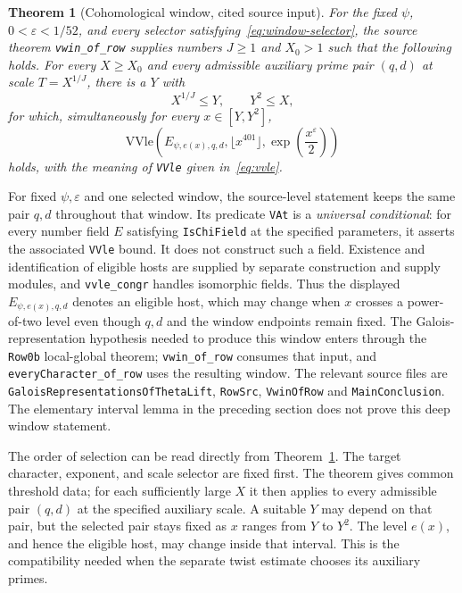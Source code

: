 \documentclass[11pt,openany,oneside]{scrbook}
\newtheorem{theorem}{Theorem}[chapter]
\theoremstyle{definition}
\theoremstyle{remark}
\newcommand{\eps}{\varepsilon}
\begin{document}
\begin{theorem}[Cohomological window, cited source input]\label{thm:quantified-window}
For the fixed $\psi$, $0<\eps<1/52$, and every selector satisfying~\eqref{eq:window-selector}, the source theorem \texttt{vwin\_of\_row} supplies numbers $J\ge1$ and $X_0>1$ such that the following holds.  For every $X\ge X_0$ and every admissible auxiliary prime pair $(q,d)$ at scale $T=X^{1/J}$, there is a $Y$ with
\[
X^{1/J}\le Y,\qquad Y^2\le X,
\]
for which, \emph{simultaneously for every} $x\in[Y,Y^2]$,
\begin{equation}\label{eq:window-vv-explicit}
\mathrm{VVle}\!\left(E_{\psi,e(x),q,d},\lfloor x^{401}\rfloor,
\exp\left(\frac{x^\eps}{2}\right)\right)
\end{equation}
holds, with the meaning of \texttt{VVle} given in~\eqref{eq:vvle}.
\end{theorem}

For fixed $\psi,\eps$ and one selected window, the source-level statement keeps the same pair $q,d$ throughout that window. Its predicate \texttt{VAt} is a \emph{universal conditional}: for every number field $E$ satisfying \texttt{IsChiField} at the specified parameters, it asserts the associated \texttt{VVle} bound. It does not construct such a field. Existence and identification of eligible hosts are supplied by separate construction and supply modules, and \texttt{vvle\_congr} handles isomorphic fields. Thus the displayed $E_{\psi,e(x),q,d}$ denotes an eligible host, which may change when $x$ crosses a power-of-two level even though $q,d$ and the window endpoints remain fixed. The Galois-representation hypothesis needed to produce this window enters through the \texttt{Row0b} local-global theorem; \texttt{vwin\_of\_row} consumes that input, and \texttt{everyCharacter\_of\_row} uses the resulting window. The relevant source files are \texttt{GaloisRepresentationsOfThetaLift}, \texttt{RowSrc}, \texttt{VwinOfRow} and \texttt{MainConclusion}. The elementary interval lemma in the preceding section does not prove this deep window statement.

The order of selection can be read directly from Theorem~\ref{thm:quantified-window}. The target character, exponent, and scale selector are fixed first. The theorem gives common threshold data; for each sufficiently large $X$ it then applies to every admissible pair $(q,d)$ at the specified auxiliary scale. A suitable $Y$ may depend on that pair, but the selected pair stays fixed as $x$ ranges from $Y$ to $Y^2$. The level $e(x)$, and hence the eligible host, may change inside that interval. This is the compatibility needed when the separate twist estimate chooses its auxiliary primes.
\end{document}
